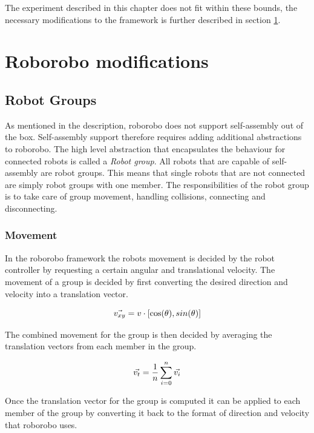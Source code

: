 The experiment described in this chapter does not fit within these bounds, the necessary modifications to the framework is further described in section \ref{sec:modifications}.



\section{Roborobo modifications}
\label{sec:modifications}


\subsection{Robot Groups}
As mentioned in the description, roborobo does not support self-assembly out of the box.
Self-assembly support therefore requires adding additional abstractions to roborobo.
The high level abstraction that encapsulates the behaviour for connected robots is called a \emph{Robot group}.
All robots that are capable of self-assembly are robot groups.
This means that single robots that are not connected are simply robot groups with one member.
The responsibilities of the robot group is to take care of group movement, handling collisions, connecting and disconnecting. 
	
\subsubsection{Movement}
In the roborobo framework the robots movement is decided by the robot controller by requesting a certain angular and translational velocity.
The movement of a group is decided by first converting the desired direction and velocity into a translation vector.
	
\begin{equation}
	\centering
	\vec{v_{xy}} = v\cdot[\cos(\theta), sin(\theta)]
\end{equation}
	
The combined movement for the group is then decided by averaging the translation vectors from each member in the group.
	
\begin{equation}
	\centering
	\vec{v_t} = \frac{1}{n}\sum_{i=0}^{n} \vec{v_{i}}
\end{equation}
	
Once the translation vector for the group is computed it can be applied to each member of the group by converting it back to the format of direction and velocity that roborobo uses.
	
